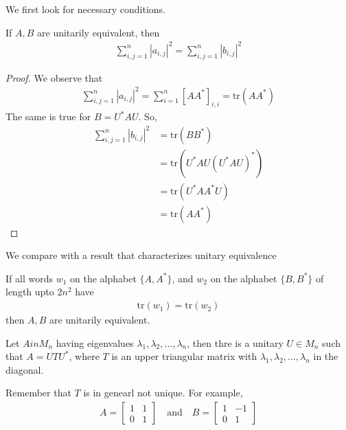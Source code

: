 We first look for necessary conditions.
\begin{proposition}
  If $A, B$ are unitarily equivalent, then
  \begin{align*}
    \sum_{i, j = 1}^{n} |a_{i, j}|^2 = \sum_{i, j = 1}^{n} |b_{i,j}|^2
  \end{align*}
\end{proposition}
\begin{proof}
  We observe that
  \begin{align*}
    \sum_{i, j = 1}^{n} |a_{i, j}|^2 = \sum_{i = 1}^{n} [AA^*]_{i, i}
    = \textrm{tr}(AA^*)
  \end{align*}
  The same is true for $B=U^*AU$. So,
  \begin{align*}
    \sum_{i, j = 1}^{n} |b_{i, j}|^2 &= \textrm{tr}(BB^*) \\
    &= \textrm{tr}(U^*AU (U^*AU)^*) \\
    &= \textrm{tr}(U^*AA^*U) \\
    &= \textrm{tr}(AA^*)
  \end{align*}
\end{proof}

We compare with a result that characterizes unitary equivalence

\begin{theorem}
  If all words $w_1$ on the alphabet $\{ A, A^* \}$, and $w_2$ on the
  alphabet $\{ B, B^* \}$ of length upto $2n^2$ have
  \begin{align*}
    \textrm{tr}(w_1) = \textrm{tr}(w_2)
  \end{align*}
  then $A, B$ are unitarily equivalent.
\end{theorem}

\begin{theorem}
  Let $A in M_n$ having eigenvalues $\lambda_1 , \lambda_2 , \ldots ,
  \lambda_n$, then thre is a unitary $U \in M_n$ such that $A =
  UTU^*$, where $T$ is an upper triangular matrix with $\lambda_1 ,
  \lambda_2 , \ldots , \lambda_n$ in the diagonal.
\end{theorem}

\begin{remark}
  Remember that $T$ is in genearl not unique. For example,
  \begin{align*}
    A =
    \begin{bmatrix}%
      1 & 1\\
      0 & 1
    \end{bmatrix} \quad \textrm{and} \quad
    B =
    \begin{bmatrix}%
      1 & -1\\
      0 & 1
    \end{bmatrix}
  \end{align*}
\end{remark}

